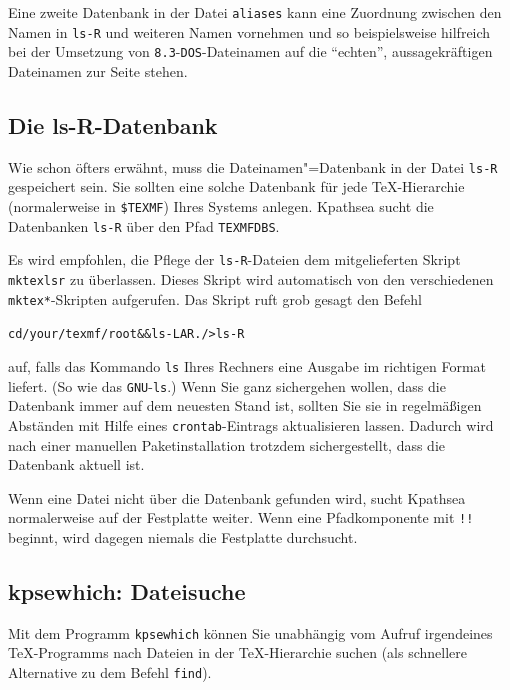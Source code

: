 \documentclass[12pt,ngerman,a4paper,fullparskip]{report}
\newcommand{\acro}[1]{\texttt{#1}}
\newcommand{\cmdname}[1]{\texttt{#1}}
\newcommand{\code}[1]{\texttt{#1}}
\newcommand{\file}[1]{\texttt{#1}}
\newcommand{\KPS}{Kpathsea\xspace}
\newcommand{\var}[1]{\texttt{#1}}
\newcommand{\samp}[1]{\texttt{#1}}
\begin{document}
Eine zweite Datenbank in der Datei \file{aliases} kann eine Zuordnung zwischen den Namen in \file{ls-R} und weiteren Namen vornehmen und so beispielsweise hilfreich bei der Umsetzung von \samp{8.3}-\acro{DOS}-Dateinamen auf die \enquote{echten}, aussagekräftigen Dateinamen zur Seite stehen.

\subsection{Die ls-R-Datenbank}\label{sec:ls-R}


Wie schon öfters erwähnt, muss die Dateinamen"=Datenbank in der Datei
\file{ls-R} gespeichert sein. Sie sollten eine solche Datenbank für jede
\TeX-Hierarchie (normalerweise in \code{\$TEXMF}) Ihres Systems anlegen.
{\KPS} sucht die Datenbanken \file{ls-R} über den Pfad \code{TEXMFDBS}.

Es wird empfohlen, die Pflege der \code{ls-R}-Dateien dem mitgelieferten
Skript \cmdname{mktexlsr} zu überlassen. Dieses Skript wird automatisch von den
verschiedenen \samp{mktex*}-Skripten aufgerufen. Das Skript ruft
grob gesagt den Befehl

\begin{alltt}
cd /\var{your}/\var{texmf}/\var{root} && ls -LAR ./ >ls-R
\end{alltt}

auf, falls das Kommando \code{ls} Ihres Rechners eine Ausgabe im richtigen
Format liefert. (So wie das \acro{GNU}-\code{ls}.) Wenn Sie ganz sichergehen
wollen, dass die Datenbank immer auf dem neuesten Stand ist, sollten Sie sie
in regelmäßigen Abständen mit Hilfe eines \cmdname{crontab}-Eintrags
aktualisieren lassen.  Dadurch wird nach einer manuellen Paketinstallation  trotzdem sichergestellt, dass die Datenbank aktuell ist.

Wenn eine Datei nicht über die Datenbank gefunden wird, sucht
{\KPS} normalerweise auf der Festplatte weiter. Wenn eine Pfadkomponente
mit \code{!!} beginnt, wird dagegen niemals die Festplatte durchsucht.


\subsection{kpsewhich: Dateisuche}
\label{sec:invoking-kpsewhich}


Mit dem Programm \cmdname{kpsewhich} können Sie unabhängig vom Aufruf
irgendeines \TeX-Programms nach Dateien in der \TeX-Hierarchie suchen
(als schnellere Alternative zu dem Befehl \cmdname{find}).
\end{document}
